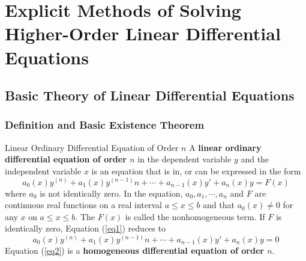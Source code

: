 
\section{Explicit Methods of Solving Higher-Order Linear Differential Equations}


\subsection{Basic Theory of Linear Differential Equations}


\subsubsection{Definition and Basic Existence Theorem}

\begin{definition}{Linear Ordinary Differential Equation of Order $n$}{}
    A \textbf{linear ordinary differential equation of order $n$} in the dependent variable $y$ and the independent variable $x$ is an equation that is in, or can be expressed in the form
    \begin{equation} \label{eq1}
        a_0(x)y^{(n)} + a_1(x)y^{(n-1)}n + \cdots + a_{n-1}(x)y' + a_n(x)y = F(x)
    \end{equation}
    where $a_0$ is not identically zero. In the equation, $a_0, a_1, \cdots, a_n$ and $F$ are continuous real functions on a real interval $a \le x \le b$ and that $a_0(x) \neq 0$ for any $x$ on $a \le x \le b$. The $F(x)$ is called the nonhomogeneous term. If $F$ is identically zero, Equation (\ref{eq1}) reduces to
    \begin{equation} \label{eq2}
        a_0(x)y^{(n)} + a_1(x)y^{(n-1)}n + \cdots + a_{n-1}(x)y' + a_n(x)y = 0
    \end{equation}
    Equation (\ref{eq2}) is a \textbf{homogeneous differential equation of order $n$}.
\end{definition}

